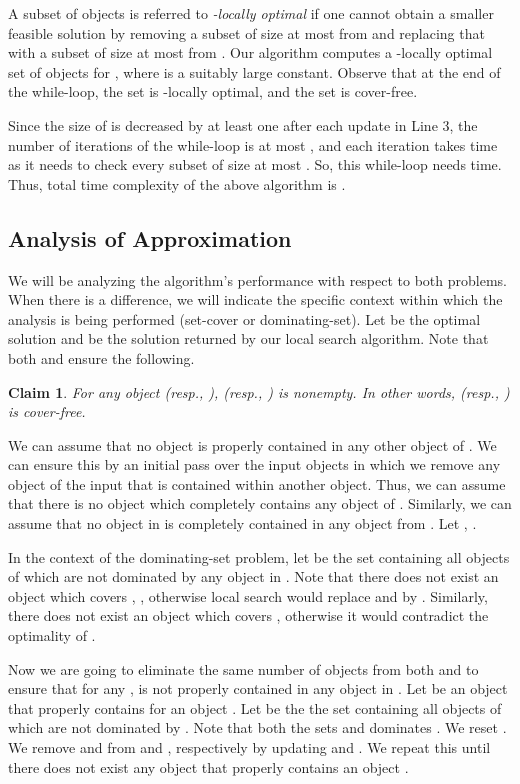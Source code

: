 \documentclass[a4paper,11pt]{article}
\newtheorem{claim}{Claim}
\begin{document}
A subset of objects   is referred to  
{\it -locally 
optimal} if one 
cannot obtain a smaller feasible solution  by removing a subset  of 
size at most  from  and replacing that with a subset of size at 
most 
 from .  Our algorithm  computes 
a 
-locally optimal 
set of objects for , where  is a 
suitably large constant. Observe that at the end  of the while-loop, the set   is -locally 
optimal, and the set   is 
cover-free. 

Since the size of  is decreased by at least one after each update in 
Line 3, 
 the number of iterations of the  while-loop is at most , and
 each iteration takes  time as it needs to check every subset of size 
at most .  So, this while-loop needs   time.  
Thus, total time complexity of  
the above algorithm is 
.

\subsection{Analysis of Approximation}\label{anls}
 {We will be analyzing the algorithm's performance with respect to both problems. When there is a difference, we will indicate the specific context within which the analysis is being performed (set-cover or dominating-set). }
Let  be the optimal solution  and  
be 
the solution 
returned by our local search algorithm. 
Note that both  and   ensure the following. 
\begin{claim}\label{cD0.0}
  {For any object  (resp., ),   (resp.,  )  is nonempty. In other words,  (resp., ) is cover-free. } 
\end{claim}

We can assume that no object  is properly contained in any other object of . We can ensure this by an initial pass over the input objects in which we remove any object of the input that is contained within another object. Thus, we can assume that there is no 
object  which completely contains any object of . 
Similarly, we can 
assume that no object in  is completely contained in any object 
from 
.   Let , . 

In the context of the dominating-set problem,
let   be the set containing  all objects of  which
are not dominated by any 
object in . 
   Note that there does not exist an object  which covers , , otherwise local search would replace   and  by . Similarly, there does not exist an object  which covers ,  otherwise it would contradict the optimality of .



Now we are going to eliminate {the} same number of objects from both  and 
 to ensure that for any ,   is not properly
  contained in any object in .
 Let  be an object that properly contains  for an object . Let   be the the set containing  all objects of  which
are not dominated by . Note that both the sets  and  dominates .
We reset .
   We remove  and  from  and , respectively by  updating {} and . We repeat this until there does not exist any object  that properly contains an object  . 
  
\end{document}
